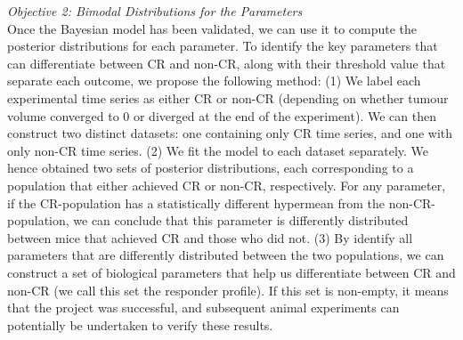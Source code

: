 \documentclass[11pt]{article}
\begin{document}

\textit{Objective 2: Bimodal Distributions for the Parameters}\\[3pt]
Once the Bayesian model has been validated, we can use it to compute the posterior distributions for each parameter. To identify the key parameters that can differentiate between CR and non-CR, along with their threshold value that separate each outcome, we propose the following method:
(1) We label each experimental time series as either CR or non-CR (depending on whether tumour volume converged to 0 or diverged at the end of the experiment). We can then construct two distinct datasets: one containing only CR time series, and one with only non-CR time series.
(2) We fit the model to each dataset separately. We hence obtained two sets of posterior distributions, each corresponding to a population that either achieved CR or non-CR, respectively. For any parameter, if the CR-population has a statistically different hypermean from the non-CR-population, we can conclude that this parameter is differently distributed between mice that achieved CR and those who did not. 
(3) By identify all parameters that are differently distributed between the two populations, we can construct a set of biological parameters that help us differentiate between CR and non-CR (we call this set the responder profile). If this set is non-empty, it means that the project was successful, and subsequent animal experiments can potentially be undertaken to verify these results.
\end{document}

